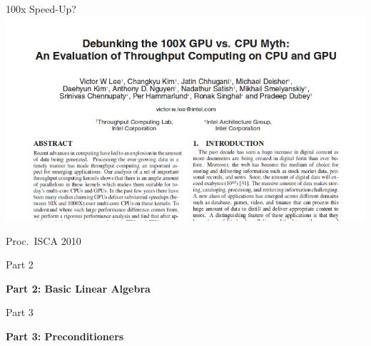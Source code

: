 

\begin{frame}{100x Speed-Up?}
 \includegraphics[width=\textwidth]{figures/debunking-100x}
 
 \begin{center} \vspace*{0.5cm} \small Proc.~ISCA 2010 \end{center}
\end{frame}










\begin{frame}{Part 2}
 \begin{center}
  \textbf{Part 2: Basic Linear Algebra}
 \end{center}
\end{frame}






\begin{frame}{Part 3}
 \begin{center}
  \textbf{Part 3: Preconditioners}
 \end{center}
\end{frame}












